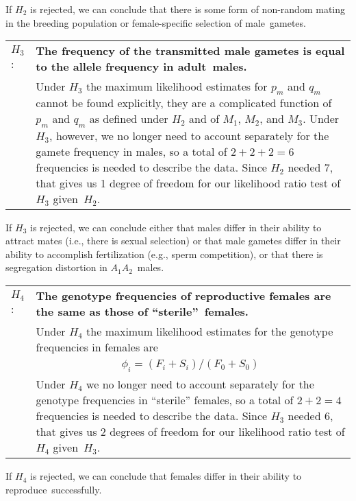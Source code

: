 \documentclass[12pt]{article}
\begin{document}
\noindent If $H_2$ is rejected, we can conclude that there is some
form of non-random mating in the breeding population or
female-specific selection of male~gametes.

\medskip

\noindent\begin{tabular}{@{}lp{6.0in}}
$H_{3}$: & \bf The frequency of the transmitted male gametes is
equal to the allele frequency in adult~males.\\
& Under $H_3$ the maximum likelihood estimates for $p_m$ and
$q_m$ cannot be found explicitly, they are a complicated function of
$p_m$ and $q_m$ as defined under $H_{2}$ and of $M_{1}$, $M_{2}$, and
$M_{3}$.  Under $H_3$, however, we no longer need to account
separately for the gamete frequency in males, so a total of $2+2+2=6$
frequencies is needed to describe the data.  Since $H_2$ needed 7,
that gives us 1 degree of freedom for our likelihood ratio test of
$H_3$ given~$H_2$.\\
\end{tabular}

\noindent If $H_3$ is rejected, we can conclude either that males
differ in their ability to attract mates (i.e., there is sexual
selection) or that male gametes differ in their ability to accomplish
fertilization (e.g., sperm competition), or that there is segregation
distortion in $A_{1}A_{2}$~males.

\medskip

\noindent\begin{tabular}{@{}lp{6.0in}}
$H_{4}$: & \bf The genotype frequencies of reproductive females are
the same as those of ``sterile''~females.\\
& Under $H_4$ the maximum likelihood estimates for the
genotype frequencies in females are \\
& $$\phi_{i} = (F_{i}+S_{i})/(F_{0}+S_{0})$$ \\
& Under $H_4$ we no longer need to account separately for the genotype
frequencies in ``sterile'' females, so a total of $2+2=4$ frequencies
is needed to describe the data.  Since $H_3$ needed 6, that gives us
2 degrees of freedom for our likelihood ratio test of $H_4$
given~$H_3$.\\
\end{tabular}

\noindent If $H_4$ is rejected, we can conclude that females differ in
their ability to reproduce~successfully.

\medskip
\end{document}
